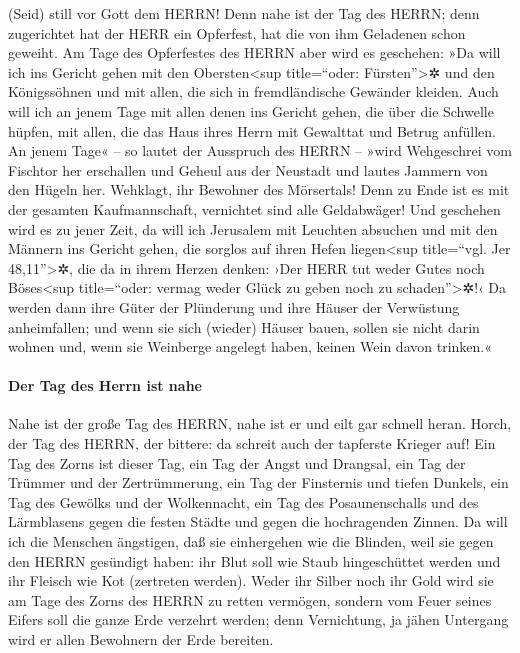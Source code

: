  (Seid) still vor Gott dem HERRN! Denn nahe ist der Tag
des HERRN; denn zugerichtet hat der HERR ein Opferfest, hat die von ihm
Geladenen schon geweiht.  Am Tage des Opferfestes des
HERRN aber wird es geschehen: »Da will ich ins Gericht gehen mit den
Obersten\textless sup title=``oder: Fürsten''\textgreater✲ und den
Königssöhnen und mit allen, die sich in fremdländische Gewänder kleiden.
 Auch will ich an jenem Tage mit allen denen ins Gericht
gehen, die über die Schwelle hüpfen, mit allen, die das Haus ihres Herrn
mit Gewalttat und Betrug anfüllen.  An jenem Tage« -- so
lautet der Ausspruch des HERRN -- »wird Wehgeschrei vom Fischtor her
erschallen und Geheul aus der Neustadt und lautes Jammern von den Hügeln
her.  Wehklagt, ihr Bewohner des Mörsertals! Denn zu Ende
ist es mit der gesamten Kaufmannschaft, vernichtet sind alle
Geldabwäger!  Und geschehen wird es zu jener Zeit, da
will ich Jerusalem mit Leuchten absuchen und mit den Männern ins Gericht
gehen, die sorglos auf ihren Hefen liegen\textless sup title=``vgl. Jer
48,11''\textgreater✲, die da in ihrem Herzen denken: ›Der HERR tut weder
Gutes noch Böses\textless sup title=``oder: vermag weder Glück zu geben
noch zu schaden''\textgreater✲!‹  Da werden dann ihre
Güter der Plünderung und ihre Häuser der Verwüstung anheimfallen; und
wenn sie sich (wieder) Häuser bauen, sollen sie nicht darin wohnen und,
wenn sie Weinberge angelegt haben, keinen Wein davon trinken.«

\hypertarget{der-tag-des-herrn-ist-nahe}{%
\paragraph{Der Tag des Herrn ist
nahe}\label{der-tag-des-herrn-ist-nahe}}

 Nahe ist der große Tag des HERRN, nahe ist er und eilt
gar schnell heran. Horch, der Tag des HERRN, der bittere: da schreit
auch der tapferste Krieger auf!  Ein Tag des Zorns ist
dieser Tag, ein Tag der Angst und Drangsal, ein Tag der Trümmer und der
Zertrümmerung, ein Tag der Finsternis und tiefen Dunkels, ein Tag des
Gewölks und der Wolkennacht,  ein Tag des Posaunenschalls
und des Lärmblasens gegen die festen Städte und gegen die hochragenden
Zinnen.  Da will ich die Menschen ängstigen, daß sie
einhergehen wie die Blinden, weil sie gegen den HERRN gesündigt haben:
ihr Blut soll wie Staub hingeschüttet werden und ihr Fleisch wie Kot
(zertreten werden).  Weder ihr Silber noch ihr Gold wird
sie am Tage des Zorns des HERRN zu retten vermögen, sondern vom Feuer
seines Eifers soll die ganze Erde verzehrt werden; denn Vernichtung, ja
jähen Untergang wird er allen Bewohnern der Erde bereiten.


